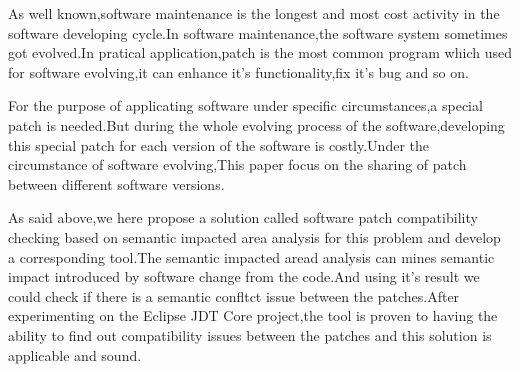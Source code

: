 \begin{eabstract} 
		As well known,software maintenance is the longest and most cost activity in the software developing cycle.In software maintenance,the software system sometimes got evolved.In pratical application,patch is the most common program which used for software evolving,it can enhance it's functionality,fix it's bug and so on.
		
		For the purpose of applicating software under specific circumstances,a special patch is needed.But during the whole evolving process of the software,developing this special patch for each version of the software is costly.Under the circumstance of software evolving,This paper focus on the sharing of patch between different software versions.
		
		As said above,we here propose a solution called software patch compatibility checking based on semantic impacted area analysis for this problem and develop a corresponding tool.The semantic impacted aread analysis can mines semantic impact introduced by software change from the code.And using it's result we could check if there is a semantic confltct issue between the patches.After experimenting on the Eclipse JDT Core project,the tool is proven to having the ability to find out compatibility issues between the patches and this solution is applicable and sound.  
		
		
\end{eabstract}


